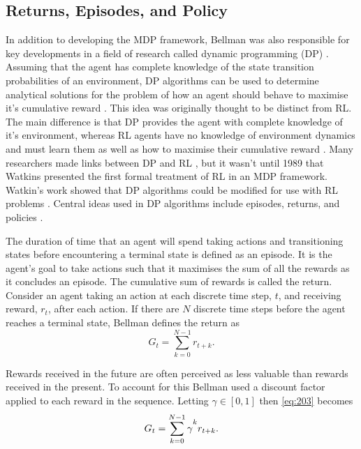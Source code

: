 \subsection{Returns, Episodes, and Policy} \label{rep}
In addition to  developing the MDP framework, Bellman was also responsible for key developments in a field of research called dynamic programming (DP) \cite{Bellm1954}. Assuming that the agent has complete knowledge of the state transition probabilities of an environment, DP algorithms can be used to determine analytical solutions for the problem of how an agent should behave to maximise it's cumulative reward \cite{Bellm1954, Howard1960}. This idea was originally thought to be distinct from RL. The main difference is that DP provides the agent with complete knowledge of it's environment, whereas RL agents have no knowledge of environment dynamics and must learn them as well as how to maximise their cumulative reward \cite{Sutton2018}. Many researchers made links between DP and RL \cite{Bellm1959, Witten1977, Werbos1987}, but it wasn't until 1989 that Watkins presented the first formal treatment of RL in an MDP framework. Watkin's work showed that DP algorithms could be modified for use with RL problems \cite{Watkins1989}. Central ideas used in DP algorithms include episodes, returns, and policies \cite{Sutton2018}.

The duration of time that an agent will spend taking actions and transitioning states before encountering a terminal state is defined as an episode. It is the agent's goal to take actions such that it maximises the sum of all the rewards as it concludes an episode. The cumulative sum of rewards is called the return. Consider an agent taking an action at each discrete time step, $t$, and receiving reward, $r_t$, after each action. If there are $N$ discrete time steps before the agent reaches a terminal state, Bellman defines the return as
\begin{equation}
	G_t = \sum_{k = 0}^{N-1} r_{t + k}. \label{eq:203}
\end{equation}

Rewards received in the future are often perceived as less valuable than rewards received in the present. To account for this Bellman used a discount factor applied to each reward in the sequence. Letting $\gamma \in [0,1]$ then \ref{eq:203} becomes
\begin{equation}
	G_t = \sum_{k = 0}^{N-1}\gamma\mystrut^k r_{t+k}. \label{eq:204}
\end{equation}

